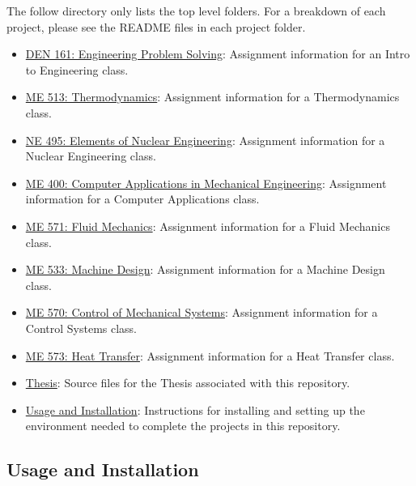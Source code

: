 The follow directory only lists the top level folders. For a breakdown of each project, please see the README files in each project folder.
\begin{itemize}
    \item \href{https://github.com/mKiloLA/python-based-mne/tree/develop/3-engineering-problem-solving}{DEN 161: Engineering Problem Solving}: Assignment information for an Intro to Engineering class.
    \item \href{https://github.com/mKiloLA/python-based-mne/tree/develop/4-thermodynamics}{ME 513: Thermodynamics}: Assignment information for a Thermodynamics class.
    \item \href{https://github.com/mKiloLA/python-based-mne/tree/develop/5-elements-of-nuclear-engineering}{NE 495: Elements of Nuclear Engineering}: Assignment information for a Nuclear Engineering class.
    \item \href{https://github.com/mKiloLA/python-based-mne/tree/develop/6-computer-applications-in-me}{ME 400: Computer Applications in Mechanical Engineering}: Assignment information for a Computer Applications class.
    \item \href{https://github.com/mKiloLA/python-based-mne/tree/develop/7-fluid-mechanics}{ME 571: Fluid Mechanics}: Assignment information for a Fluid Mechanics class.
    \item \href{https://github.com/mKiloLA/python-based-mne/tree/develop/8-machine-design}{ME 533: Machine Design}: Assignment information for a Machine Design class.
    \item \href{https://github.com/mKiloLA/python-based-mne/tree/develop/9-control-of-mechanical-systems}{ME 570: Control of Mechanical Systems}: Assignment information for a Control Systems class.
    \item \href{https://github.com/mKiloLA/python-based-mne/tree/develop/10-heat-transfer}{ME 573: Heat Transfer}: Assignment information for a Heat Transfer class.
    \item \href{https://github.com/mKiloLA/python-based-mne/tree/develop/thesis}{Thesis}: Source files for the Thesis associated with this repository.
    \item \href{https://github.com/mKiloLA/python-based-mne/tree/develop/usage-and-installation}{Usage and Installation}: Instructions for installing and setting up the environment needed to complete the projects in this repository.
\end{itemize}

\subsection*{Usage and Installation}


